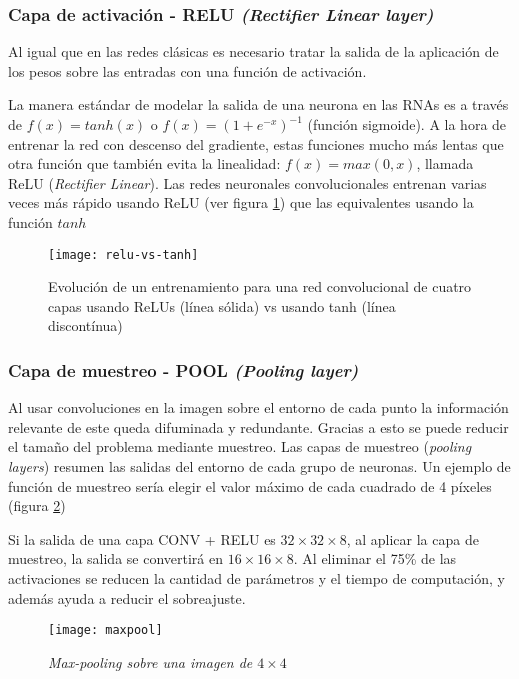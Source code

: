 \subsubsection{Capa de activación - RELU \textit{(Rectifier Linear layer)}}
\label{sec:relu}

Al igual que en las redes clásicas es necesario tratar la salida de la aplicación de los pesos sobre las entradas con una función de activación. 

La manera estándar de modelar la salida de una neurona en las RNAs es a través de $f(x) = tanh(x)$ o $f(x) = (1 + e^{-x})^{-1}$ (función sigmoide). A la hora de entrenar la red con descenso del gradiente, estas funciones mucho más lentas que otra función que también evita la linealidad: $f(x) = max(0, x)$, llamada ReLU (\textit{Rectifier Linear}). Las redes neuronales convolucionales entrenan varias veces más rápido usando ReLU (ver figura \ref{relu-vs-tanh}) que las equivalentes usando la función $tanh$ \parencite{krizhevsky2012imagenet}

\begin{figure}
    \centering
    \caption{Evolución de un entrenamiento para una red convolucional de cuatro capas usando ReLUs (línea sólida) vs usando tanh (línea discontínua) \parencite{krizhevsky2012imagenet}}
  \label{relu-vs-tanh}
  \texttt{[image: relu-vs-tanh]}
\end{figure}

\subsubsection{Capa de muestreo - POOL \textit{(Pooling layer)}}

Al usar convoluciones en la imagen sobre el entorno de cada punto la información relevante de este queda difuminada y redundante. Gracias a esto se puede reducir el tamaño del problema mediante muestreo.
Las capas de muestreo (\textit{pooling layers}) resumen las salidas del entorno de cada grupo de neuronas. Un ejemplo de función de muestreo sería elegir el valor máximo de cada cuadrado de 4 píxeles (figura \ref{maxpool})

Si la salida de una capa CONV + RELU es $32 \times 32 \times 8$, al aplicar la capa de muestreo, la salida se convertirá en $16 \times 16 \times 8$. Al eliminar el 75\% de las activaciones se reducen la cantidad de parámetros y el tiempo de computación, y además ayuda a reducir el sobreajuste.

\begin{figure}
    \centering
    \caption{\textit{Max-pooling sobre una imagen de $4\times4$}}
  \label{maxpool}
  \texttt{[image: maxpool]}
\end{figure}

